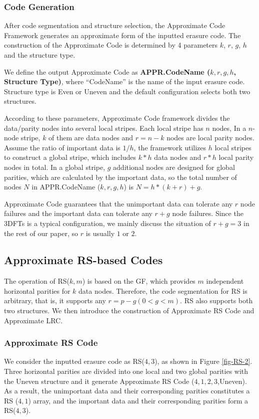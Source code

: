 \documentclass[sigconf]{acmart}
\begin{document}
\subsubsection{Code Generation}\label{code-gen}
After code segmentation and structure selection, the Approximate Code Framework generates an approximate form of the inputted erasure code.
The construction of the Approximate Code is determined by 4 parameters $k$, $r$, $g$, $h$ and the structure type.

We define the output Approximate Code as \textbf{APPR.CodeName ($k,r,g,h$, Structure Type)}, where ``CodeName'' is the name of the input erasure code. Structure type is Even or Uneven and the default configuration selects both two structures.

According to these parameters, Approximate Code framework divides the data/parity nodes into several local stripes. Each local stripe has $n$ nodes,  
In a $n$-node stripe, $k$ of them are data nodes and $r=n-k$ nodes are local parity nodes.
Assume the ratio of important data is $1/h$, the framework utilizes $h$ local stripes to construct a global stripe, which includes $k*h$ data nodes and $r*h$ local parity nodes in total.
In a global stripe, $g$ additional nodes are designed for global parities, which are calculated by the important data, so the total number of nodes $N$ in APPR.CodeName ($k,r,g,h$) is
$N= h*(k+r) + g$.

Approximate Code guarantees that the unimportant data can tolerate any $r$ node failures and the important data can tolerate any $r+g$ node failures.
Since the 3DFTs is a typical configuration, we mainly discuss the situation of $r+g=3$ in the rest of our paper, so $r$ is usually $1$ or $2$.%

\subsection{Approximate RS-based Codes}\label{appr-rsbased}
The operation of RS($k,m$) is based on the GF, which provides $m$ independent horizontal parities for $k$ data nodes. Therefore, the code segmentation for RS is arbitrary, that is, it supports any $r=p-g(0<g<m)$. RS also supports both two structures. We then introduce the construction of Approximate RS Code and Approximate LRC.

\subsubsection{Approximate RS Code}
We consider the inputted erasure code as RS($4,3$), as shown in Figure \ref{fig-RS-2}. Three horizontal parities are divided into one local and two global parities with the Uneven structure and it generate Approximate RS Code ($4,1,2,3$,Uneven).
As a result, the unimportant data and their corresponding parities constitutes a RS ($4,1$) array, and the important data and their corresponding parities form a RS($4,3$).
\end{document}
